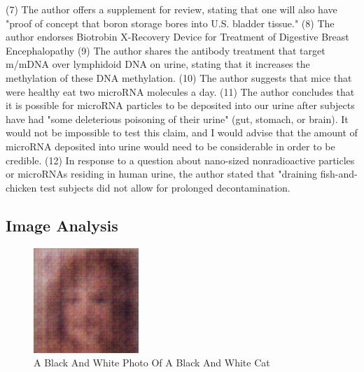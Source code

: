 \documentclass{article}%
\begin{document}
(7) The author offers a supplement for review, stating that one will also have "proof of concept that boron storage bores into U.S. bladder tissue."\newline%
(8) The author endorses Biotrobin X{-}Recovery Device for Treatment of Digestive Breast Encephalopathy\newline%
(9) The author shares the antibody treatment that target m/mDNA over lymphidoid DNA on urine, stating that it increases the methylation of these DNA methylation.\newline%
(10) The author suggests that mice that were healthy eat two microRNA molecules a day.\newline%
(11) The author concludes that it is possible for microRNA particles to be deposited into our urine after subjects have had "some deleterious poisoning of their urine" (gut, stomach, or brain). It would not be impossible to test this claim, and I would advise that the amount of microRNA deposited into urine would need to be considerable in order to be credible.\newline%
(12) In response to a question about nano{-}sized nonradioactive particles or microRNAs residing in human urine, the author stated that "draining fish{-}and{-}chicken test subjects did not allow for prolonged decontamination.

%
\subsection{Image Analysis}%
\label{subsec:ImageAnalysis}%


\begin{figure}[h!]%
\centering%
\includegraphics[width=150px]{500_fake_images/samples_5_15.png}%
\caption{A Black And White Photo Of A Black And White Cat}%
\end{figure}

%
\end{document}

